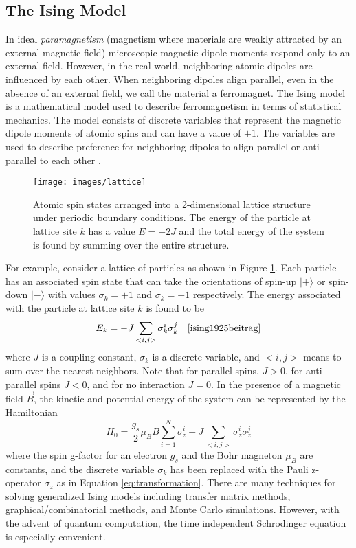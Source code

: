 \subsection{The Ising Model}
In ideal \textit{paramagnetism} (magnetism where materials are weakly attracted by an external magnetic field) microscopic magnetic dipole moments respond only to an external field. 
However, in the real world, neighboring atomic dipoles are influenced by each other. 
When neighboring dipoles align parallel, even in the absence of an external field, we call the material a ferromagnet. 
The Ising model is a mathematical model used to describe ferromagnetism in terms of statistical mechanics. The model consists of discrete variables that represent the magnetic dipole moments of atomic spins and can have a value of $\pm 1$. 
The variables are used to describe preference for neighboring dipoles to align parallel or anti-parallel to each other \cite{schroeder2011thermal}.

\begin{figure}[h]
	\begin{center}
		\texttt{[image: images/lattice]}
	\end{center}
	\caption{\doublespacing Atomic spin states arranged into a 2-dimensional lattice structure under periodic boundary conditions. The energy of the particle at lattice site $k$ has a value $E = -2J$ and the total energy of the system is found by summing over the entire structure.}
	\label{fig:lattice}
\end{figure}

For example, consider a lattice of particles as shown in Figure \ref{fig:lattice}. 
Each particle has an associated spin state that can take the orientations of spin-up $|+\rangle$ or spin-down $|-\rangle$ with values $\sigma_k = +1$ and $\sigma_k = -1$ respectively. The energy associated with the particle at lattice site $k$ is found to be 
\begin{equation}
	E_k= - J\sum_{<i,j>}\sigma_k^i\sigma_k^j \quad \cite{ising1925beitrag}
	\label{eq:latticeSiteEnergy}
\end{equation}
where $J$ is a coupling constant, $\sigma_k$ is a discrete variable, and $<i,j>$ means to sum over the nearest neighbors. Note that for parallel spins, $J>0$, for anti-parallel spins $J<0$, and for no interaction $J = 0$. 
In the presence of a magnetic field $\vec{B}$, the kinetic and potential energy of the system can be represented by the Hamiltonian
\begin{equation}
	H_0 = \frac{g_s}{2}\mu_B B\sum_{i=1}^N \sigma_z^i - J\sum_{<i,j>}\sigma_z^i\sigma_z^j
	\label{eq:isingHamiltonian}
\end{equation} 
where the spin g-factor for an electron $g_s$ and the Bohr magneton $\mu_B$ are constants, and the discrete variable $\sigma_k$ has been replaced with the Pauli z-operator $\sigma_z$ as in Equation \ref{eq:transformation}. 
There are many techniques for solving generalized Ising models including transfer matrix methods\cite{onsager1944crystal}, graphical/combinatorial methods\cite{feynman1972statistical}, and Monte Carlo simulations\cite{schroeder2011thermal}. 
However, with the advent of quantum computation, the time independent Schrodinger equation is especially convenient.